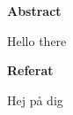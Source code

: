 \begin{center}\normalfont\Large\bfseries\centering Abstract\end{center}
Hello there

\newpage

\begin{center}\normalfont\Large\bfseries\centering Referat\end{center}
Hej på dig
